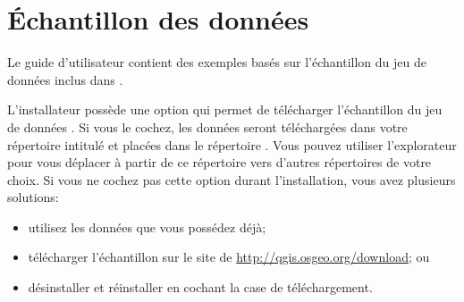 \section{Échantillon des données}\label{label_sampledata}


Le guide d'utilisateur contient des exemples basés sur l'échantillon du jeu de données inclus dans \qg.
\par
\win L'installateur \mswin possède une option qui permet de télécharger l'échantillon du jeu de données \qg.
Si vous le cochez, les données seront téléchargées dans votre répertoire intitulé  et placées dans le répertoire . Vous pouvez utiliser l'explorateur \mswin pour vous déplacer à partir de ce répertoire vers d'autres répertoires de votre choix.
Si vous ne cochez pas cette option durant l'installation, vous avez plusieurs solutions:
\begin{itemize}[label=--]
\item utilisez les données que vous possédez déjà;
\item télécharger l'échantillon sur le site de \qg
 \url{http://qgis.osgeo.org/download}; ou
 \item désinstaller et réinstaller \qg en cochant la case de téléchargement.
\end{itemize}
\par\bigskip

